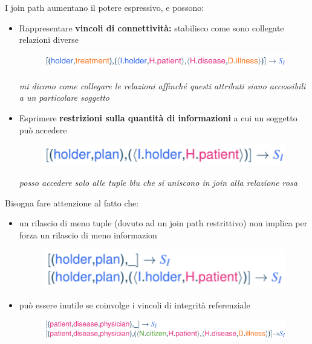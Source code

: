 \documentclass{report}
\begin{document}
\noindent I join path aumentano il potere espressivo, e possono:
\begin{itemize}
    \item Rappresentare \textbf{vincoli di connettività:} stabilisco come sono collegate relazioni diverse
    
    \begin{figure}[H]
        \centering
        \includegraphics[width=0.8\linewidth]{images/vincoli-conn.png}
    \end{figure}
    \textit{mi dicono come collegare le relazioni affinché questi attributi siano 
    accessibili a un particolare soggetto}
    
    \newpage
    \item Esprimere \textbf{restrizioni sulla quantità di informazioni} a cui un soggetto può accedere 
    
    \begin{figure}[H]
        \centering
        \includegraphics[width=0.5\linewidth]{images/restrizioni.png}
    \end{figure}

    \textit{posso accedere solo alle tuple blu che si uniscono in join alla relazione rosa}

\end{itemize}

\noindent Bisogna fare attenzione al fatto che:
\begin{itemize}
    \item un rilascio di meno tuple (dovuto ad un join path restrittivo) 
    non implica per forza un rilascio di meno informazion
    \begin{figure}[H]
        \centering
        \includegraphics[width=0.5\linewidth]{images/ex1.png}
    \end{figure}
    \item può essere inutile se coinvolge i vincoli di integrità referenziale
    \begin{figure}[H]
        \centering
        \includegraphics[width=0.9\linewidth]{images/ex2.png}
    \end{figure}
\end{itemize} 
\end{document}
